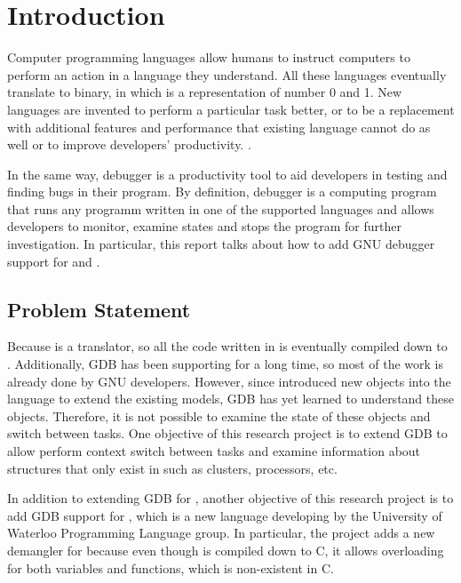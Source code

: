 \chapter{Introduction} \label{introduction}

Computer programming languages allow humans to instruct computers to perform an
action in a language they understand. All these languages eventually translate
to binary, in which is a representation of number 0 and 1. New languages are
invented to perform a particular task better, or to be a replacement with
additional features and performance that existing language cannot do as well or
to improve developers' productivity.
\cite{Reference1}.

In the same way, debugger is a productivity tool to aid developers in testing
and finding bugs in their program. By definition, debugger is a computing program that runs
any programm written in one of the supported languages and allows developers to
monitor, examine states and stops the program for further investigation. In
particular, this report talks about how to add GNU debugger support for \uCPPS
and \CFA.

\section{Problem Statement}
Because \uCPPS is a translator, so all the code written in \uCPPS is eventually
compiled down to \CC. Additionally, GDB has been supporting \CCS for a long time,
so most of the work is already done by GNU developers. However, since \uCPPS introduced
new objects into the language to extend the existing models, GDB has yet learned
to understand these objects. Therefore, it is not possible to examine the state
of these objects and switch between tasks. One objective of this research
project is to extend GDB to allow perform context switch
between tasks and examine information about structures that only exist in \uCPPS
such as clusters, processors, etc.

In addition to extending GDB for \uCPPS, another objective of this research project
is to add GDB support for \CFA, which is a new language developing by the
University of Waterloo Programming Language group. In particular, the project
adds a new demangler for \CFAS because even though \CFAS is compiled
down to C, it allows overloading for both variables and functions, which is
non-existent in C.
